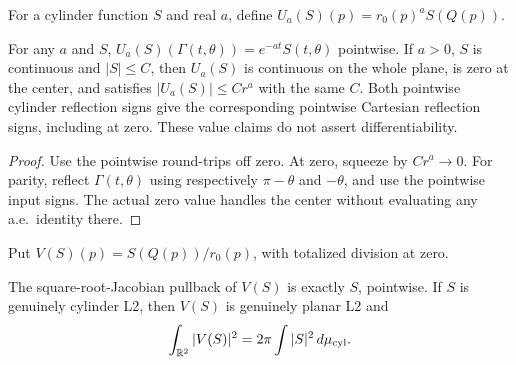 \begin{definition}
\label{def:cylinder-physical-value}
\leanok
For a cylinder function $S$ and real $a$, define
$U_a(S)(p)=r_0(p)^aS(Q(p))$.
\end{definition}

\begin{lemma}
\label{lem:cylinder-physical-value}
\leanok
For any $a$ and $S$, $U_a(S)(\Gamma(t,\theta))=e^{-at}S(t,\theta)$ pointwise.
If $a>0$, $S$ is continuous and $|S|\le C$, then $U_a(S)$ is continuous on the
whole plane, is zero at the center, and satisfies $|U_a(S)|\le Cr^a$ with the
same $C$.
Both pointwise cylinder reflection signs give the corresponding pointwise
Cartesian reflection signs, including at zero.
These value claims do not assert differentiability.
\end{lemma}

\begin{proof}
\leanok
Use the pointwise round-trips off zero.
At zero, squeeze by $Cr^a\to0$.
For parity, reflect $\Gamma(t,\theta)$ using respectively $\pi-\theta$ and
$-\theta$, and use the pointwise input signs. The actual zero value handles
the center without evaluating any a.e.\ identity there.
\end{proof}

\begin{definition}
\label{def:cylinder-physical-l2-inverse}
\leanok
Put $V(S)(p)=S(Q(p))/r_0(p)$, with totalized division at zero.
\end{definition}

\begin{lemma}
\label{lem:cylinder-physical-l2-inverse}
\leanok
The square-root-Jacobian pullback of $V(S)$ is exactly $S$, pointwise.
If $S$ is genuinely cylinder L2, then $V(S)$ is genuinely planar L2 and
\[
 \int_{\mathbb{R}^2}|V(S)|^2=2\pi\int|S|^2\,d\mu_{\rm cyl}.
\]
\end{lemma}

